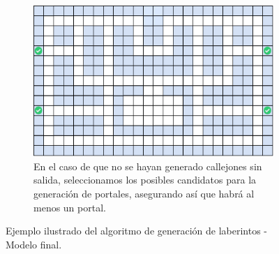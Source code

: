 \begin{figure}[H]
        \par\bigskip
        \begin{subfigure}[b]{0.95\textwidth}
            \centering
            \includegraphics[scale=0.45]{img/paso15.png}
            \caption{En el caso de que no se hayan generado callejones sin salida, seleccionamos los posibles candidatos para la generación de portales, asegurando así que habrá al menos un portal.}
        \end{subfigure}
        \caption{Ejemplo ilustrado del algoritmo de generación de laberintos - Modelo final.}
        \label{fig:final1}
        
    \end{figure}
    

